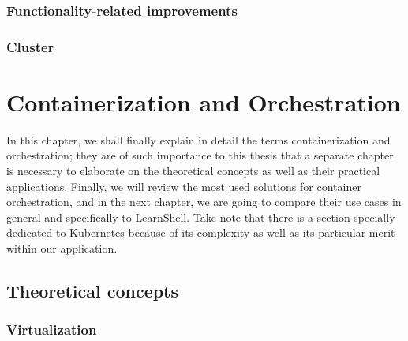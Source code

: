 \documentclass[thesis=B,english]{FITthesis}[2019/12/23]
\begin{document}
\subsection{Functionality-related improvements}

\subsection{Cluster}


\chapter{Containerization and Orchestration}

In this chapter, we shall finally explain in detail the terms containerization and orchestration; they are of such importance to this thesis that a separate chapter is necessary to elaborate on the theoretical concepts as well as their practical applications. Finally, we will review the most used solutions for container orchestration, and in the next chapter, we are going to compare their use cases in general and specifically to LearnShell. Take note that there is a section specially dedicated to Kubernetes because of its complexity as well as its particular merit within our application.

\section{Theoretical concepts}

\subsection{Virtualization}
\end{document}
